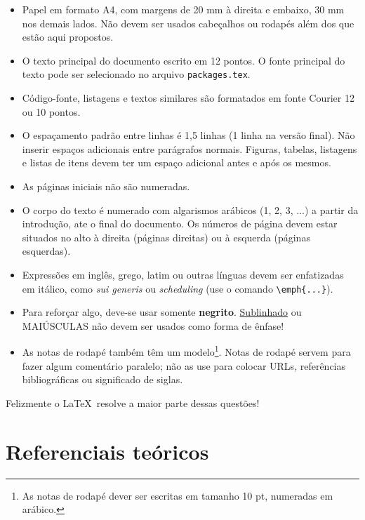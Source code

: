 \documentclass[12pt,openright,oneside,a4paper,chapter=TITLE,section=TITLE,subsection=Title,english,french,spanish,portugues,sumario=tradicional]{04-class-files/abntex2}
\begin{document}
\begin{itemize}

\item Papel em formato A4, com margens de 20 mm à direita e embaixo, 30 mm nos demais lados. Não devem ser usados cabeçalhos ou rodapés além dos que estão aqui propostos.

\item O texto principal do documento escrito em 12 pontos. O fonte principal do texto pode ser selecionado no arquivo \verb#packages.tex#.

\item Código-fonte, listagens e textos similares são formatados em fonte Courier 12 ou 10 pontos.

\item O espaçamento padrão entre linhas é 1,5 linhas (1 linha na versão final). Não inserir espaços adicionais entre parágrafos normais. Figuras, tabelas, listagens e listas de itens devem ter um espaço adicional antes e após os mesmos.

\item As páginas iniciais não são numeradas.

\item O corpo do texto é numerado com algarismos arábicos (1, 2, 3, ...) a partir da introdução, ate o final do documento. Os números de página devem estar situados no alto à direita (páginas direitas) ou à esquerda (páginas esquerdas).

\item Expressões em inglês, grego, latim ou outras línguas devem ser enfatizadas em itálico, como \emph{sui generis} ou \emph{scheduling} (use o comando \verb#\emph{...}#).

\item Para reforçar algo, deve-se usar somente \textbf{negrito}. \underline{Sublinhado} ou MAIÚSCULAS não devem ser usados como forma de ênfase!

\item As notas de rodapé também têm um modelo\footnote{As notas de rodapé dever ser escritas em tamanho 10 pt, numeradas em arábico.}. Notas de rodapé servem para fazer algum comentário paralelo; não as use para colocar URLs, referências bibliográficas ou significado de siglas.

\end{itemize}

Felizmente o \LaTeX~resolve a maior parte dessas questões!

\part{Referenciais teóricos}
\end{document}

